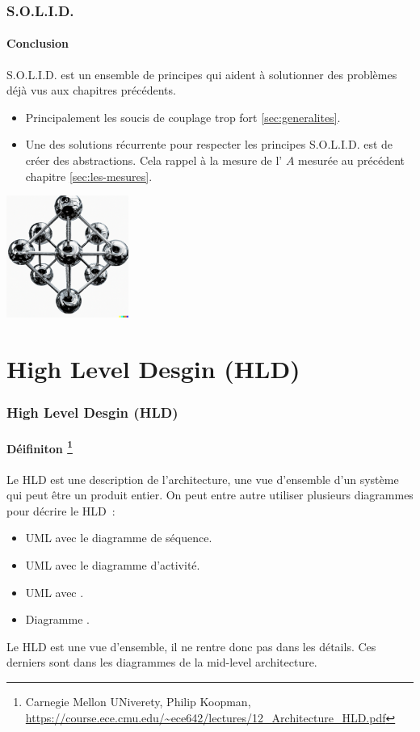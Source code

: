 \documentclass{beamer}
\begin{document}
    \begin{frame}
        \transdissolve
        \frametitle{S.O.L.I.D.}
        \framesubtitle{Conclusion}
        S.O.L.I.D. est un ensemble de principes qui aident à solutionner des problèmes déjà vus aux chapitres précédents.
        \begin{itemize}
            \item Principalement les soucis de couplage trop fort \cref{sec:generalites}.
            \item Une des solutions récurrente pour respecter les principes S.O.L.I.D. est de créer des abstractions.
            Cela rappel à la mesure de l' $A$ mesurée au précédent chapitre \cref{sec:les-mesures}.
        \end{itemize}
        \bigbreak
        \centering
        \includegraphics[width=4cm]{image/carbon-atoms}
    \end{frame}


    \section{High Level Desgin (HLD)}\label{sec:high-level-design}

    \begin{frame}
        \transdissolve
        \frametitle{High Level Desgin (HLD)}
        \framesubtitle{Déifiniton \footnote{Carnegie Mellon UNiverety, Philip Koopman, \url{https://course.ece.cmu.edu/~ece642/lectures/12_Architecture_HLD.pdf}}}
        Le HLD est une description de l'architecture, une vue d'ensemble d'un système qui peut être un produit entier.
        \bigbreak
        On peut entre autre utiliser plusieurs diagrammes pour décrire le HLD~:
        \begin{itemize}
            \item UML avec le diagramme de séquence.
            \item UML avec le diagramme d'activité.
            \item UML avec .
            \item Diagramme .
        \end{itemize}
        \bigbreak
        Le HLD est une vue d'ensemble, il ne rentre donc pas dans les détails.
        Ces derniers sont dans les diagrammes de la mid-level architecture.
    \end{frame}
\end{document}
